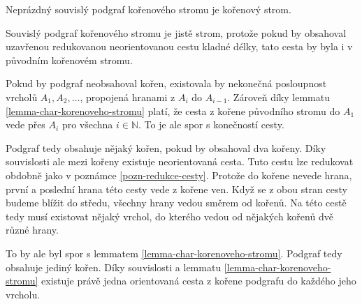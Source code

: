 
\begin{tvrz}\label{tvrzeni-podgraf-korenoveho-stromu}
    Neprázdný souvislý podgraf kořenového stromu je kořenový strom.
\end{tvrz}
\begin{dukaz}
    Souvislý podgraf kořenového stromu je jistě strom, protože pokud by obsahoval uzavřenou redukovanou neorientovanou cestu kladné délky, tato cesta by byla i v původním kořenovém stromu. 

    Pokud by podgraf neobsahoval kořen, existovala by nekonečná posloupnost vrcholů $A_1, A_2, \dots$, propojená hranami z $A_i$ do $A_{i-1}$. Zároveň díky lemmatu \ref{lemma-char-korenoveho-stromu} platí, že cesta z kořene původního stromu do $A_1$ vede přes $A_i$ pro všechna $i \in \mathbb{N}$. To je ale spor s konečností cesty. 

    Podgraf tedy obsahuje nějaký kořen, pokud by obsahoval dva kořeny. Díky souvislosti ale mezi kořeny existuje neorientovaná cesta. Tuto cestu lze redukovat obdobně jako v poznámce \ref{pozn-redukce-cesty}. Protože do kořene nevede hrana, první a poslední hrana této cesty vede z kořene ven. Když se z obou stran cesty budeme blížit do středu, všechny hrany vedou směrem od kořenů. Na této cestě tedy musí existovat nějaký vrchol, do kterého vedou od nějakých kořenů dvě různé hrany. 
    
    To by ale byl spor s lemmatem \ref{lemma-char-korenoveho-stromu}. Podgraf tedy obsahuje jediný kořen. Díky souvislosti a lemmatu \ref{lemma-char-korenoveho-stromu} existuje právě jedna orientovaná cesta z kořene podgrafu do každého jeho vrcholu. 
\end{dukaz}

